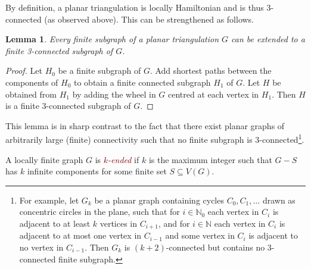 \documentclass[a4paper,11pt]{article}
\makeatletter
\newcommand{\hdefn}[2]{\textcolor{Maroon}{\emph{#1-#2}}\index{#2@#1-#2}}
\theoremstyle{plain}
\newtheorem{lem}[thm]{Lemma}
\theoremstyle{definition}
\newcommand{\NN}{\mathbb{N}}
\makeatother
\begin{document}
By definition, a planar triangulation is locally Hamiltonian and is thus 3-connected  (as observed above). This can be strengthened as follows. 

\begin{lem}
\label{Extended3Connected}
Every finite subgraph of a planar triangulation $G$ can be extended to a finite 3-connected subgraph of $G$.
\end{lem}

\begin{proof}
Let $H_0$ be a finite subgraph of $G$. Add shortest paths between the components of $H_0$ to obtain a finite connected subgraph $H_1$ of $G$. Let $H$ be obtained from $H_1$ by adding the wheel in $G$ centred at each vertex in $H_1$. Then $H$ is a finite 3-connected subgraph of $G$.
\end{proof}

This lemma is in sharp contrast to the fact that there exist planar graphs of arbitrarily large (finite) connectivity such that no finite subgraph is 3-connected\footnote{For example, let $G_k$ be a planar graph containing cycles $C_0,C_1, \ldots$ drawn as concentric circles in the plane, such that for $i\in\NN_0$ each vertex in $C_i$ is adjacent to at least $k$ vertices in $C_{i+1}$, and for $i\in\NN$ each vertex in $C_i$ is adjacent to at most one vertex in $C_{i-1}$ and some vertex in $C_i$ is adjacent to no vertex in $C_{i-1}$. Then $G_k$ is $(k+2)$-connected but contains no 3-connected finite subgraph.}.

A locally finite graph $G$ is \hdefn{$k$}{ended} if $k$ is the maximum integer such that $G-S$ has $k$ infinite components for some finite set $S\subseteq V(G)$. 

%
%


\end{document}
